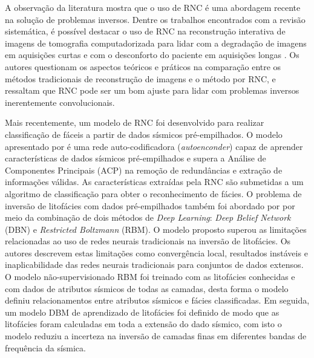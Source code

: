 A observação da literatura mostra que o uso de RNC é uma abordagem recente na solução de problemas inversos.
Dentre os trabalhos encontrados com a revisão sistemática, é possível destacar
o uso de RNC na reconstrução interativa de imagens de tomografia computadorizada para lidar
com a degradação de imagens em aquisições curtas e com o desconforto do paciente em aquisições longas \citep{Hwan16}. 
Os autores questionam os aspectos teóricos e práticos na comparação entre os métodos tradicionais de
reconstrução de imagens e o método por RNC, e ressaltam que RNC pode ser um bom ajuste para lidar com
problemas inversos inerentemente convolucionais.

Mais recentemente, um modelo de RNC foi desenvolvido para realizar classificação de fáceis a partir de dados
sísmicos pré-empilhados. O modelo apresentado por \cite{Qian17} é uma rede auto-codificadora (\textit{autoenconder})
capaz de aprender características de dados sísmicos pré-empilhados e supera a Análise de Componentes Principais (ACP)
na remoção de redundâncias e extração de informações válidas. As características extraídas pela RNC são submetidas a um algoritmo
de classificação para obter o reconhecimento de fácies. O problema de inversão de litofácies com dados pré-empilhados também foi
abordado por \cite{Lihui2017} por meio da combinação de dois métodos de \textit{Deep Learning}: \textit{Deep Belief Network} (DBN)
e \textit{Restricted Boltzmann} (RBM).
O modelo proposto superou as limitações relacionadas ao uso de redes neurais tradicionais na inversão de litofácies. Os autores
descrevem estas limitações como convergência local, resultados instáveis e inaplicabilidade das redes neurais tradicionais para 
conjuntos de dados extensos. O modelo não-supervisionado RBM foi treinado com as litofácies conhecidas e com dados de atributos
sísmicos de todas as camadas, desta forma o modelo definiu relacionamentos entre atributos sísmicos e fácies classificadas.
Em seguida, um modelo DBM de aprendizado de litofácies foi definido de modo que as litofácies foram
calculadas em toda a extensão do dado sísmico, com isto o modelo reduziu a incerteza na inversão de camadas finas
em diferentes bandas de frequência da sísmica.


